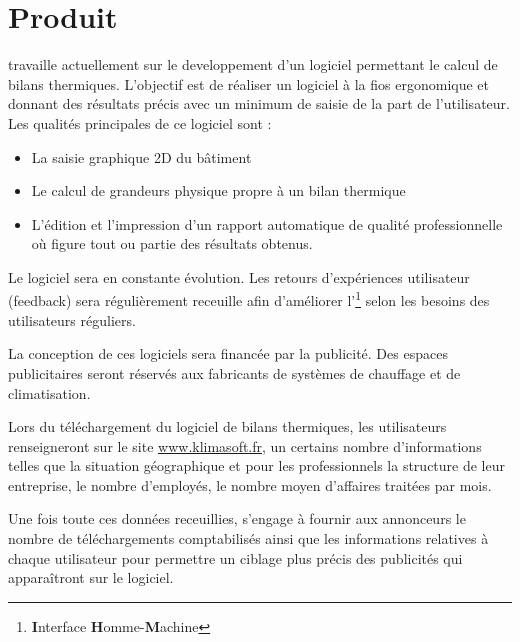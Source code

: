 \section{Produit}
  \K{} travaille actuellement sur le developpement d'un logiciel
  permettant le calcul de bilans thermiques. L'objectif est de
  réaliser un logiciel à la fios ergonomique et donnant des résultats
  précis avec un minimum de saisie de la part de l'utilisateur.
  Les qualités principales de ce logiciel sont :
  \begin{itemize}
	\item La saisie graphique 2D du bâtiment
	\item Le calcul de grandeurs physique propre à un bilan thermique
	\item L'édition et l'impression d'un rapport automatique de qualité
		professionnelle où figure tout ou partie des résultats obtenus.
  \end{itemize}\vspace{10px}
  Le logiciel sera en constante évolution. Les retours d'expériences utilisateur (feedback)
  sera régulièrement receuille afin d'améliorer 
  l'\footnote{\textbf{I}nterface \textbf{H}omme-\textbf{M}achine}
  selon les besoins des utilisateurs réguliers.

  La conception de ces logiciels sera financée par la publicité.
  Des espaces publicitaires seront réservés aux fabricants de
  systèmes de chauffage et de climatisation.

  Lors du téléchargement du logiciel de bilans thermiques, les utilisateurs
  renseigneront sur le site \url{www.klimasoft.fr}, un certains nombre
  d'informations telles que la situation géographique et pour les professionnels
  la structure de leur entreprise, le nombre d'employés, le nombre moyen
  d'affaires traitées par mois.

  Une fois toute ces données receuillies, \K{} s'engage à fournir aux annonceurs
  le nombre de téléchargements comptabilisés ainsi que les informations
  relatives à chaque utilisateur pour permettre un ciblage plus précis des
  publicités qui apparaîtront sur le logiciel.
